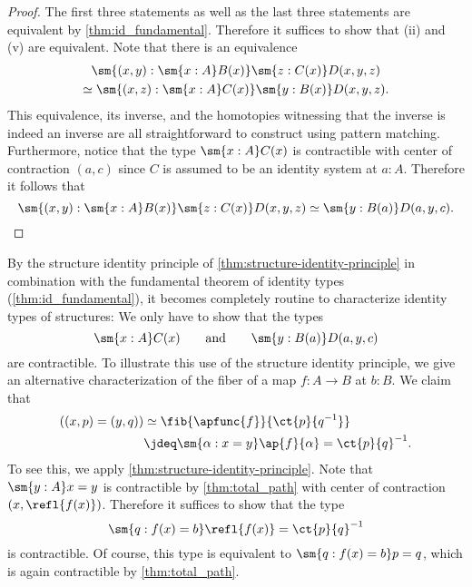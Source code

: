 \begin{proof}
  The first three statements as well as the last three statements are equivalent by \cref{thm:id_fundamental}. Therefore it suffices to show that (ii) and (v) are equivalent. Note that there is an equivalence
  \begin{multline*}
    \sm{(x,y):\sm{x:A}B(x)}\sm{z:C(x)}D(x,y,z) \\
    \simeq
    \sm{(x,z):\sm{x:A}C(x)}\sm{y:B(x)}D(x,y,z).
  \end{multline*}
  This equivalence, its inverse, and the homotopies witnessing that the inverse is indeed an inverse are all straightforward to construct using pattern matching. Furthermore, notice that the type $\sm{x:A}C(x)$ is contractible with center of contraction $(a,c)$ since $C$ is assumed to be an identity system at $a:A$. Therefore it follows that
  \begin{equation*}
    \sm{(x,y):\sm{x:A}B(x)}\sm{z:C(x)}D(x,y,z)\simeq\sm{y:B(a)}D(a,y,c).\qedhere
  \end{equation*}
\end{proof}

\begin{eg}
  By the structure identity principle of \cref{thm:structure-identity-principle} in combination with the fundamental theorem of identity types (\cref{thm:id_fundamental}), it becomes completely routine to characterize identity types of structures: We only have to show that the types
  \begin{equation*}
    \sm{x:A}C(x)\qquad\text{and}\qquad\sm{y:B(a)}D(a,y,c)
  \end{equation*}
  are contractible. To illustrate this use of the structure identity principle, we give an alternative characterization of the fiber of a map $f:A \to B$ at $b:B$. We claim that
  \begin{align*}
    ((x,p)=(y,q)) & \simeq \fib{\apfunc{f}}{\ct{p}{q^{-1}}} \\
                  & \jdeq \sm{\alpha:x=y}\ap{f}{\alpha}=\ct{p}{q}^{-1}.
  \end{align*}
  To see this, we apply \cref{thm:structure-identity-principle}. Note that $\sm{y:A}x=y$ is contractible by \cref{thm:total_path} with center of contraction $(x,\refl{f(x)})$. Therefore it suffices to show that the type
  \begin{equation*}
    \sm{q:f(x)=b}\refl{f(x)}=\ct{p}{q}^{-1}
  \end{equation*}
  is contractible. Of course, this type is equivalent to $\sm{q:f(x)=b}p=q$, which is again contractible by \cref{thm:total_path}.
\end{eg}


